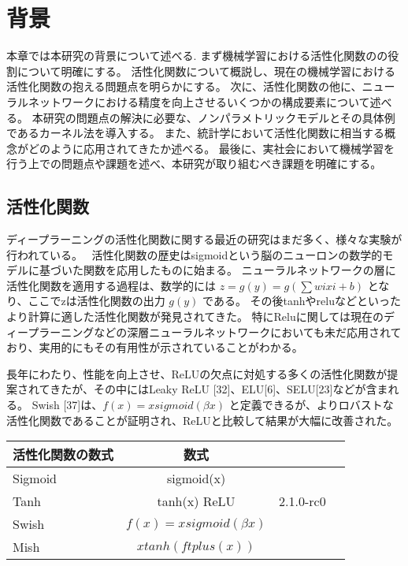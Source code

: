 \chapter{背景}
\label{background}

本章では本研究の背景について述べる.
まず機械学習における活性化関数のの役割について明確にする。
活性化関数について概説し、現在の機械学習における活性化関数の抱える問題点を明らかにする。
次に、活性化関数の他に、ニューラルネットワークにおける精度を向上させるいくつかの構成要素について述べる。
本研究の問題点の解決に必要な、ノンパラメトリックモデルとその具体例であるカーネル法を導入する。
また、統計学において活性化関数に相当する概念がどのように応用されてきたか述べる。
最後に、実社会において機械学習を行う上での問題点や課題を述べ、本研究が取り組むべき課題を明確にする。



\section{活性化関数}

ディープラーニングの活性化関数に関する最近の研究はまだ多く、様々な実験が 行われている。~\cite{af_list}
活性化関数の歴史はsigmoidという脳のニューロンの数学的モデルに基づいた関数を応用したものに始まる。
ニューラルネットワークの層に活性化関数を適用する過程は、数学的には $ z=g(y)=g(\sum wixi+b) $ となり、ここでzは活性化関数の出力 $ g(y) $ である。
その後tanhやreluなどといったより計算に適した活性化関数が発見されてきた。
特にReluに関しては現在のディープラーニングなどの深層ニューラルネットワークにおいても未だ応用されており、実用的にもその有用性が示されていることがわかる。

長年にわたり、性能を向上させ、ReLUの欠点に対処する多くの活性化関数が提案されてきたが、その中にはLeaky ReLU [32]、ELU[6]、SELU[23]などが含まれる。
Swish [37]は、$ f(x)=xsigmoid(\beta x) $ と定義できるが、よりロバストな活性化関数であることが証明され、ReLUと比較して結果が大幅に改善された。

\begin{tabular}{l*{2}{c}r}
活性化関数の数式              & 数式 \\
\hline
Sigmoid            & sigmoid(x) \\
Tanh               & tanh(x)
ReLU        & 2.1.0-rc0 \\
Swish           & $ f(x)= xsigmoid(\beta x) $ \\
Mish           & $ xtanh(f t plus(x)) $ \\

\end{tabular}



